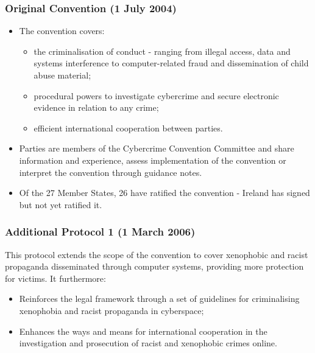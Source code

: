 \subsubsection{Original Convention (1 July 2004)}
\begin{itemize}[itemsep=0pt]
  \item The convention covers:
    \begin{itemize}[itemsep=0pt]
      \item the criminalisation of conduct - ranging from illegal access, data and systems interference to computer-related fraud and dissemination of child abuse material;
      \item procedural powers to investigate cybercrime and secure electronic evidence in relation to any crime;
      \item efficient international cooperation between parties.
    \end{itemize}
  \item Parties are members of the Cybercrime Convention Committee and share information and experience, assess implementation of the convention or interpret the convention through guidance notes.
  \item Of the 27 Member States, 26 have ratified the convention - Ireland has signed but not yet ratified it.
\end{itemize}

\subsubsection{Additional Protocol 1 (1 March 2006)}

This protocol extends the scope of the convention to cover xenophobic and racist propaganda disseminated through computer systems, providing more protection for victims. It furthermore:

\begin{itemize}[itemsep=0pt]
  \item  Reinforces the legal framework through a set of guidelines for criminalising xenophobia and racist propaganda in cyberspace;
  \item Enhances the ways and means for international cooperation in the investigation and prosecution of racist and xenophobic crimes online.
\end{itemize}

